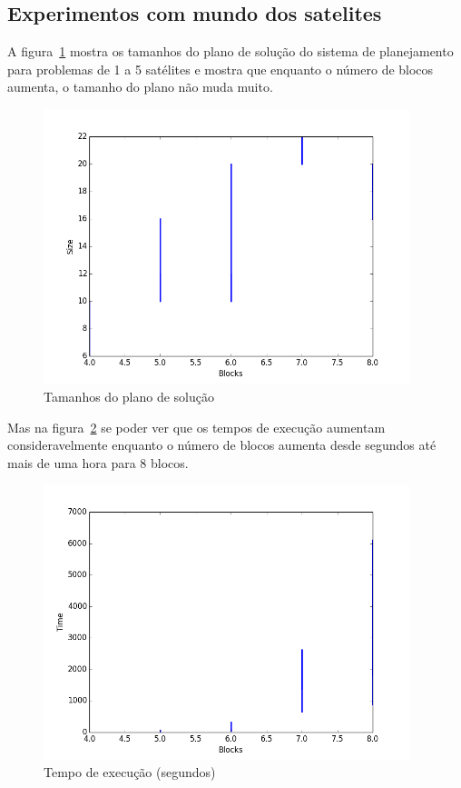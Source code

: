 \subsection{Experimentos com mundo dos satelites}
\label{subsec:expsatelites}
	A figura~\ref{fig:satsize} mostra os tamanhos do plano de solução do sistema de planejamento para problemas de 1 a 5 satélites e mostra que enquanto o número de blocos aumenta, o tamanho do plano não muda muito.
		\begin{figure}[H]
			\centering
			\includegraphics[height=8cm]{images/blocks-size}
			\caption{Tamanhos do plano de solução}
			\label{fig:satsize}
		\end{figure}
	Mas na figura~\ref{fig:sattime} se poder ver que os tempos de execução aumentam consideravelmente enquanto o número de blocos aumenta desde segundos até mais de uma hora para 8 blocos.
		\begin{figure}[H]
			\centering
			\includegraphics[height=8cm]{images/blocks-time}
			\caption{Tempo de execução (segundos)}
			\label{fig:sattime}
		\end{figure}
